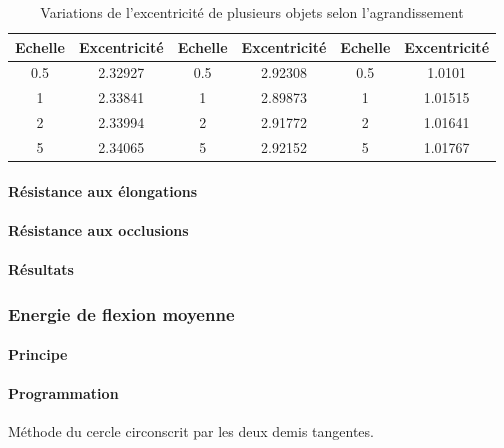 \documentclass{article}
\theoremstyle{definition}
\begin{document}
\begin{table}[!h]
\begin{tabular}{|c|c|c|c|c|c|}
	    \hline
	    \textbf{Echelle} & \textbf{Excentricité} & \textbf{Echelle} & \textbf{Excentricité} & \textbf{Echelle} & \textbf{Excentricité} \\
	    \hline
	    0.5 & 2.32927 & 0.5 & 2.92308 & 0.5 & 1.0101 \\
	    \hline
	    1 & 2.33841 & 1 & 2.89873 & 1 & 1.01515 \\
	    \hline
	    2 & 2.33994 & 2 & 2.91772 & 2 & 1.01641 \\
	    \hline
	    5 & 2.34065 & 5 & 2.92152 & 5 & 1.01767 \\
	    \hline
	  \end{tabular}
	  \caption{Variations de l'excentricité de plusieurs objets selon l'agrandissement}
	  \label{excentricité-scaling-table}
	  \end{table}  
	  
	\paragraph{Résistance aux élongations}
	
	\paragraph{Résistance aux occlusions}
	  
	\paragraph{Résultats}
	  

      
      \subsubsection{Energie de flexion moyenne}
      
	\paragraph{Principe}
	
	\paragraph{Programmation}
	
	  Méthode du cercle circonscrit par les deux demis tangentes.
	  
\end{document}
